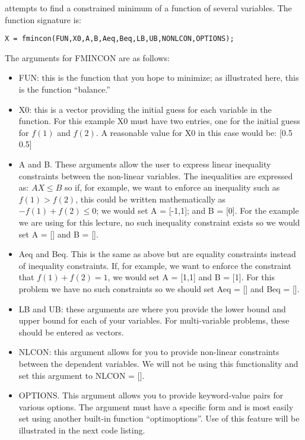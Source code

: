  attempts to find a constrained minimum of a function of several variables. The function signature is:

\begin{lstlisting}
X = fmincon(FUN,X0,A,B,Aeq,Beq,LB,UB,NONLCON,OPTIONS);
\end{lstlisting}

The arguments for FMINCON are as follows:
\begin{itemize}
\item FUN: this is the function that you hope to minimize; as illustrated here, this is the function ``balance.''
\item X0: this is a vector providing the initial guess for each variable in the function.  For this example X0 must have two entries, one for the initial guess for $f(1)$ and $f(2)$.  A reasonable value for X0 in this case would be: [0.5 0.5]
\item A and B.  These arguments allow the user to express linear inequality constraints between the non-linear variables.  The inequalities are expressed as: $AX \le B$ so if, for example, we want to enforce an inequality such as $f(1) > f(2)$, this could be written mathematically as $-f(1)+f(2) \le 0$; we would set A = [-1,1]; and B = [0].  For the example we are using for this lecture, no such inequality constraint exists so we would set A = [] and B = [].  
\item Aeq and Beq.  This is the same as above but are equality constraints instead of inequality constraints.  If, for example, we want to enforce the constraint that $f(1) + f(2) = 1$, we would set A = [1,1] and B = [1]. For this problem we have no such constraints so we should set Aeq = [] and Beq = [].

\item LB and UB: these arguments are where you provide the lower bound and upper bound for each of your variables.  For multi-variable problems, these should be entered as vectors.

\item NLCON: this argument allows for you to provide non-linear constraints between the dependent variables.  We will not be using this functionality and set this argument to NLCON = [].
\item OPTIONS.  This argument allows you to provide keyword-value pairs for various options.  The argument must have a specific form and is most easily set using another built-in function ``optimoptions''.  Use of this feature will be illustrated in the next code listing.
\end{itemize}

